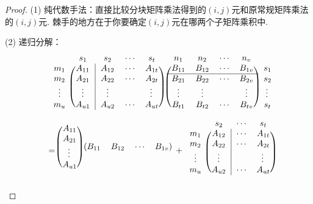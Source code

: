 \documentclass{article}
\begin{document}
\begin{proof}
(1) 纯代数手法：直接比较分块矩阵乘法得到的$(i,j)$元和原常规矩阵乘法的$(i,j)$元. 棘手的地方在于你要确定$(i,j)$元在哪两个子矩阵乘积中.

(2) 递归分解：
$$
\begin{array}{ll}
&\begin{blockarray}{ccccc}
    & s_1    & s_2    & \cdots & s_t  \\
\begin{block}{c(c|ccc)}    
m_1 & A_{11} & A_{12} & \cdots & A_{1t} \\
m_2 & A_{21} & A_{22} & \cdots & A_{2t} \\
\vdots & \vdots & \vdots & 		 & \vdots \\
m_u & A_{u1} & A_{u2} & \cdots & A_{ut} \\
\end{block} 
\end{blockarray}~
\begin{blockarray}{ccccc}
n_1    & n_2    & \cdots & n_v  &\\
\begin{block}{(cccc)c}
B_{11} & B_{12} & \cdots & B_{1v} & s_1 \\
\BAhhline{----}
B_{21} & B_{22} & \cdots & B_{2v} & s_2 \\
\vdots & \vdots & 		 & \vdots & \vdots \\
B_{t1} & B_{t2} & \cdots & B_{tv} & s_t \\
\end{block}
\end{blockarray}\\
&= \begin{blockarray}{(c)}
A_{11} \\
A_{21} \\
\vdots \\
A_{u1} \\
\end{blockarray}
\begin{blockarray}{(cccc)}
B_{11} & B_{12} & \cdots & B_{1v} 
\end{blockarray}  + 
\begin{blockarray}{cccc}
    & s_2    & \cdots & s_t  \\
\begin{block}{c(c|cc)}    
m_1  & A_{12} & \cdots & A_{1t} \\
m_2  & A_{22} & \cdots & A_{2t} \\
\vdots & \vdots & 		 & \vdots \\
m_u  & A_{u2} & \cdots & A_{ut} \\

\end{block}
\end{blockarray}
\end{array}$$
\end{proof}
\end{document}
